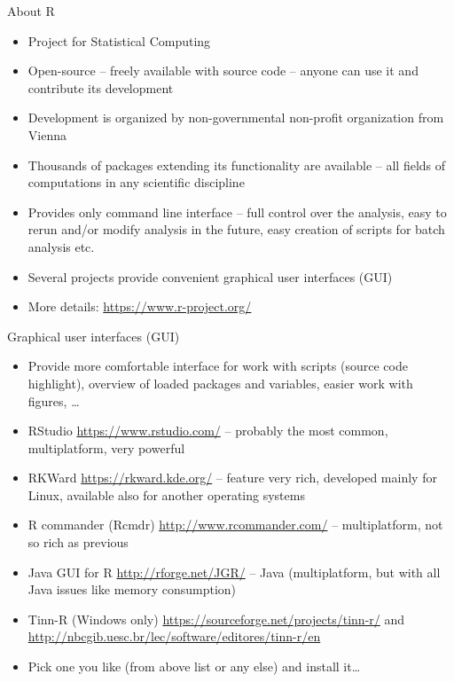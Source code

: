 \documentclass[compress, ucs, xelatex, 11pt, xcolor=svgnames,
  hyperref={
    bookmarks=true,
    unicode=true,
    colorlinks=true,
    pdftitle={Molecular data in R},
    plainpages=false,
    pdfauthor={Vojtech Zeisek},
    pdfsubject={Course about phylogeny and evolution in R},
    pdfcreator={XeLaTeX},
    pdfkeywords={R, evolution, phylogeny, molecular data},
    linkcolor=Tomato,
    anchorcolor=SaddleBrown,
    citecolor=Goldenrod,
    filecolor=DarkMagenta,
    menucolor=Sienna,
    urlcolor=DarkTurquoise,
    pdftex},
  url={hyphens, lowtilde} %
  ]{beamer}
\begin{document}
\begin{frame}{About R}
\begin{itemize}
 \item Project for Statistical Computing
 \item Open-source -- freely available with source code -- anyone can use it and contribute its development
 \item Development is organized by non-governmental non-profit organization from Vienna
 \item Thousands of packages extending its functionality are available -- all fields of computations in any scientific discipline
 \item Provides only command line interface -- full control over the analysis, easy to rerun and/or modify analysis in the future, easy creation of scripts for batch analysis etc.
 \item Several projects provide convenient graphical user interfaces (GUI)
 \item More details: \url{https://www.r-project.org/}
\end{itemize}
\end{frame}

\begin{frame}{Graphical user interfaces (GUI)}
\begin{itemize}
 \item Provide more comfortable interface for work with scripts (source code highlight), overview of loaded packages and variables, easier work with figures, \ldots
 \item RStudio \url{https://www.rstudio.com/} -- probably the most common, multiplatform, very powerful
 \item RKWard \url{https://rkward.kde.org/} -- feature very rich, developed mainly for Linux, available also for another operating systems
 \item R commander (Rcmdr) \url{http://www.rcommander.com/} -- multiplatform, not so rich as previous
 \item Java GUI for R \url{http://rforge.net/JGR/} -- Java (multiplatform, but with all Java issues like memory consumption)
 \item Tinn-R (Windows only) \url{https://sourceforge.net/projects/tinn-r/} and \url{http://nbcgib.uesc.br/lec/software/editores/tinn-r/en}
 \item Pick one you like (from above list or any else) and install it\ldots
\end{itemize}
\end{frame}
\end{document}
